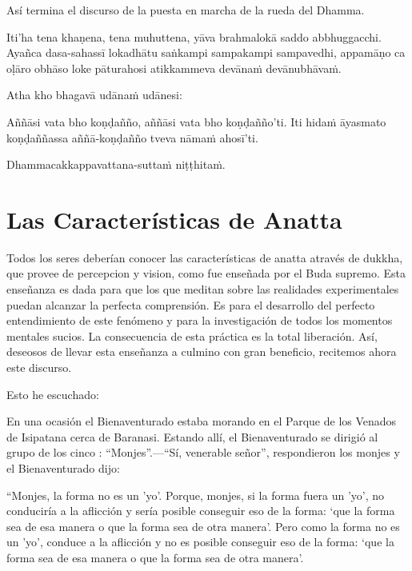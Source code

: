 Así termina el discurso de la puesta en marcha de la rueda del Dhamma.

\clearpage

\paliText
\markboth{\paliTitle}{\rightmark}

Iti'ha tena khaṇena, tena muhuttena, yāva brahmalokā saddo abbhuggacchi.
Ayañca dasa-sahassī lokadhātu saṅkampi sampakampi sampavedhi, appamāṇo ca
oḷāro obhāso loke pāturahosi atikkammeva devānaṁ devānubhāvaṁ.

Atha kho bhagavā udānaṁ udānesi:

Aññāsi vata bho koṇḍañño, aññāsi vata bho koṇḍañño'ti. Iti hidaṁ āyasmato
koṇḍaññassa aññā-koṇḍañño tveva nāmaṁ ahosī'ti.

Dhammacakkappavattana-suttaṁ niṭṭhitaṁ.

\chapterTocDelegatePageNumber
\chapter{Las Características de Anatta}

\setTocDelegatedPageNumber
\englishText
\renewcommand{\englishTitle}{Las Características de Anatta}

\begin{leader}

Todos los seres deberían conocer las características de anatta através de dukkha, que provee de percepcion y vision, como fue enseñada por el Buda supremo.
Esta enseñanza es dada para que los que meditan sobre las realidades experimentales puedan alcanzar la perfecta comprensión.
Es para el desarrollo del perfecto entendimiento de este fenómeno y para la investigación de todos los momentos mentales sucios.
La consecuencia de esta práctica es la total liberación. Así, deseosos de llevar esta enseñanza a culmino con gran beneficio, recitemos ahora este discurso.

\end{leader}

Esto he escuchado:

En una ocasión el Bienaventurado estaba morando en el Parque de los Venados de Isipatana cerca de Baranasi. Estando allí, el Bienaventurado se dirigió al grupo de los cinco : “Monjes”.—“Sí, venerable señor”, respondieron los monjes y el Bienaventurado dijo:

“Monjes, la forma no es un 'yo'. Porque, monjes, si la forma fuera un 'yo', no conduciría a la aflicción y sería posible conseguir eso de la forma: ‘que la forma sea de esa manera o que la forma sea de otra manera’. Pero como la forma no es un 'yo', conduce a la aflicción y no es posible conseguir eso de la forma: ‘que la forma sea de esa manera o que la forma sea de otra manera’.


